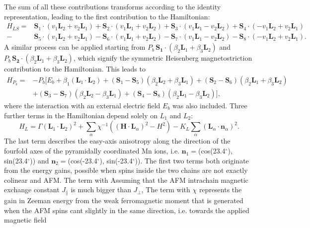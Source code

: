 The sum of all these contributions transforms according to the identity representation, leading to the first contribution to the Hamiltonian:
\begin{align}
    H_{LS} =& \mathbf{S}_1 \cdot (v_1 \mathbf{L}_2 + v_2 \mathbf{L}_1) + \mathbf{S}_2 \cdot (v_1 \mathbf{L}_1 + v_2 \mathbf{L}_2) + \mathbf{S}_3 \cdot (v_1 \mathbf{L}_1 - v_2 \mathbf{L}_2) + \mathbf{S}_4 \cdot (-v_1 \mathbf{L}_2 + v_2 \mathbf{L}_1) \nonumber\\
    -&\mathbf{S}_5 \cdot (v_1 \mathbf{L}_2 + v_2 \mathbf{L}_1) - \mathbf{S}_6 \cdot (v_1 \mathbf{L}_1 + v_2 \mathbf{L}_2) - \mathbf{S}_7 \cdot (v_1 \mathbf{L}_1 - v_2 \mathbf{L}_2) - \mathbf{S}_8 \cdot (-v_1 \mathbf{L}_2 + v_2 \mathbf{L}_1).
\end{align}
A similar process can be applied starting from $P_b \, \mathbf{S_1}\cdot(\beta_2 \mathbf{L}_1 + \beta_3 \mathbf{L}_2)$ and $P_b\, \mathbf{S_2}\cdot(\beta_2 \mathbf{L}_1 + \beta_3 \mathbf{L}_2)$, which signify the symmetric Heisenberg magnetostriction contribution to the Hamiltonian. This leads to
\begin{align}
	H_{P_b}=&-P_b[E_b + \beta_1 (\mathbf{L}_1\cdot \mathbf{L}_2)+
    (\mathbf{S}_1-\mathbf{S}_5)(\beta_2 \mathbf{L}_2 + \beta_3 \mathbf{L}_1) +
    (\mathbf{S}_2-\mathbf{S}_6)(\beta_2 \mathbf{L}_1 + \beta_3 \mathbf{L}_2) \nonumber\\ 
    &+(\mathbf{S}_3-\mathbf{S}_7)(\beta_2 \mathbf{L}_2 - \beta_3 \mathbf{L}_1) +
    (\mathbf{S}_4-\mathbf{S}_8)(\beta_2 \mathbf{L}_1 - \beta_3 \mathbf{L}_2)],
\end{align}
where the interaction with an external electric field $E_b$ was also included. 
Three further terms in the Hamiltonian depend solely on $L_1$ and $L_2$:
\begin{equation}
	H_L = \Gamma(\mathbf{L}_1\cdot \mathbf{L}_2)^2
    +\sum_{\alpha}\chi^{-1}((\mathbf{H}\cdot \mathbf{L}_\alpha)^2-H^2)
    -K_L\sum_\alpha(\mathbf{L}_\alpha\cdot \mathbf{n}_\alpha)^2\label{eq:GdMn2O5_hami_1}.
\end{equation}
The last term describes the easy-axis anisotropy along the direction of the fourfold axes of the pyramidally coordinated Mn ions, i.e. $\mathbf{n}_1=$(cos(23.4$^\circ$), sin(23.4$^\circ$)) and $\mathbf{n}_2=$(cos(-23.4$^\circ$), sin(-23.4$^\circ$)).
The first two terms both originate from the energy gains, possible when spins inside the two chains are not exactly colinear and AFM.
The term with Assuming that the AFM intrachain magnetic exchange constant $J_\|$ is much bigger than $J_\perp$,
The term with $\chi$ represents the gain in Zeeman energy from the weak ferromagnetic moment that is generated when the AFM spins cant slightly in the same direction, i.e. towards the applied magnetic field   
